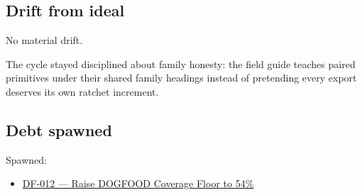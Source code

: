 \subsection{Drift from ideal}\label{record-073-drift-from-ideal}

No material drift.

The cycle stayed disciplined about family honesty: the field guide teaches paired primitives under their shared family headings instead of pretending every export deserves its own ratchet increment.

\subsection{Debt spawned}\label{record-073-debt-spawned}

Spawned:

\begin{itemize}
\tightlist
\item
  \href{https://github.com/flyingrobots/bijou/blob/cbd70612140e7a450d764b3c7be1c6af878b99bc/docs/design/DF-012-raise-dogfood-coverage-floor-to-54-percent.md}{DF-012 --- Raise DOGFOOD Coverage Floor to 54\%}
\end{itemize}

